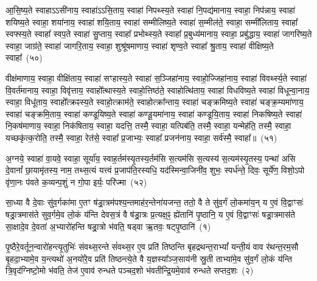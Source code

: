 आ॒सि॒ष्य॒ते स्वाहा\-ऽ\-ऽसी॑नाय॒ स्वाहा॑\-ऽ\-ऽसि॒ताय॒ स्वाहा॑ निपथ्स्य॒ते स्वाहा॑ नि॒पद्य॑मानाय॒ स्वाहा॒ निप॑न्नाय॒ स्वाहा॑ शयिष्य॒ते स्वाहा॒ शया॑नाय॒ स्वाहा॑ शयि॒ताय॒ स्वाहा॑ सम्मीलिष्य॒ते स्वाहा॑ स॒म्मील॑ते॒ स्वाहा॒ सम्मी॑लिताय॒ स्वाहा᳚ स्वफ्स्य॒ते स्वाहा᳚ स्वप॒ते स्वाहा॑ सु॒प्ताय॒ स्वाहा᳚ प्रभोथ्स्य॒ते स्वाहा᳚ प्र॒बुध्य॑मानाय॒ स्वाहा॒ प्रबु॑द्धाय॒ स्वाहा॑ जागरिष्य॒ते स्वाहा॒ जाग्र॑ते॒ स्वाहा॑ जागरि॒ताय॒ स्वाहा॒ शुश्रू॑षमाणाय॒ स्वाहा॑ शृण्व॒ते स्वाहा᳚ श्रु॒ताय॒ स्वाहा॑ वीक्षिष्य॒ते स्वाहा᳚~(५०)

वीक्ष॑माणाय॒ स्वाहा॒ वीक्षि॑ताय॒ स्वाहा॑ सꣳहास्य॒ते स्वाहा॑ स॒ञ्जिहा॑नाय॒ स्वाहो॒ज्जिहा॑नाय॒ स्वाहा॑ विवर्थ्स्य॒ते स्वाहा॑ वि॒वर्त॑मानाय॒ स्वाहा॒ विवृ॑त्ताय॒ स्वाहो᳚त्थास्य॒ते स्वाहो॒त्तिष्ठ॑ते॒ स्वाहोत्थि॑ताय॒ स्वाहा॑ विधविष्य॒ते स्वाहा॑ विधून्वा॒नाय॒ स्वाहा॒ विधू॑ताय॒ स्वाहो᳚त्क्रꣴस्य॒ते स्वाहो॒त्क्राम॑ते॒ स्वाहोत्क्रा᳚न्ताय॒ स्वाहा॑ चङ्क्रमिष्य॒ते स्वाहा॑ चङ्क्र॒म्यमा॑णाय॒ स्वाहा॑ चङ्क्रमि॒ताय॒ स्वाहा॑ कण्डूयिष्य॒ते स्वाहा॑ कण्डू॒यमा॑नाय॒ स्वाहा॑ कण्डूयि॒ताय॒ स्वाहा॑ निकषिष्य॒ते स्वाहा॑ नि॒कष॑माणाय॒ स्वाहा॒ निक॑षिताय॒ स्वाहा॒ यदत्ति॒ तस्मै॒ स्वाहा॒ यत्पिब॑ति॒ तस्मै॒ स्वाहा॒ यन्मेह॑ति॒ तस्मै॒ स्वाहा॒ यच्छकृ॑त्क॒रोति॒ तस्मै॒ स्वाहा॒ रेत॑से॒ स्वाहा᳚ प्र॒जाभ्यः॒ स्वाहा᳚ प्रजन॑नाय॒ स्वाहा॒ सर्व॑स्मै॒ स्वाहा᳚॥~(५१)

{\anuvakamend[{}]}

अ॒ग्नये॒ स्वाहा॑ वा॒यवे॒ स्वाहा॒ सूर्या॑य॒ स्वाह॒र्तम॑स्यृ॒तस्य॒र्तम॑सि स॒त्यम॑सि स॒त्यस्य॑ स॒त्यम॑स्यृ॒तस्य॒ पन्था॑ असि दे॒वानां᳚ छा॒यामृ॑तस्य॒ नाम॒ तथ्स॒त्यं यत्त्वं प्र॒जा\-प॑ति॒रस्यधि॒ यद॑स्मिन्वा॒जिनी॑व॒ शुभः॒ स्पर्ध॑न्ते॒ दिवः॒ सूर्ये॑ण॒ विशो॒\-ऽपो वृ॑णा॒नः प॑वते क॒व्यन्प॒शुं न गो॒पा इर्यः॒ परि॑ज्मा~(५२)


{\anuvakamend[{}]}


\setcounter{anuvakam}{0}
सा॒ध्या वै दे॒वाः सु॑व॒र्गका॑मा ए॒तꣳ ष॑ड्रा॒त्रम॑पश्य॒न्तमाह॑र॒न्तेना॑यजन्त॒ ततो॒ वै ते सु॑व॒र्गं लो॒कमा॑य॒न् य ए॒वं वि॒द्वाꣳसः॑ षड्रा॒त्रमास॑ते सुव॒र्गमे॒व लो॒कं य॑न्ति देवस॒त्रं वै ष॑ड्रा॒त्रः प्र॒त्यक्ष॒ꣴ॒ ह्ये॑तानि॑ पृ॒ष्ठानि॒ य ए॒वं वि॒द्वाꣳसः॑ षड्रा॒त्रमास॑ते सा॒क्षादे॒व दे॒वता॑ अ॒भ्यारो॑हन्ति षड्रा॒त्रो भ॑वति॒ षड्वा ऋ॒तवः॒ षट्पृ॒ष्ठानि॑~(१)

पृ॒ष्ठैरे॒वर्तून॒न्वारो॑हन्त्यृ॒तुभिः॑ संवथ्स॒रन्ते सं॑वथ्स॒र ए॒व प्रति॑ तिष्ठन्ति बृहद्रथन्त॒रा\-भ्यां᳚ यन्ती॒यं वाव र॑थन्त॒रम॒सौ बृ॒हदा॒भ्यामे॒व य॒न्त्यथो॑ अ॒नयो॑रे॒व प्रति॑ तिष्ठन्त्ये॒ते वै य॒ज्ञस्या᳚ञ्ज॒साय॑नी स्रु॒ती ताभ्या॑मे॒व सु॑व॒र्गं लो॒कं य॑न्ति त्रि॒वृद॑ग्निष्टो॒मो भ॑वति॒ तेज॑ ए॒वाव॑ रुन्धते पञ्चद॒शो भ॑वतीन्द्रि॒यमे॒वाव॑ रुन्धते सप्तद॒शः~(२)

